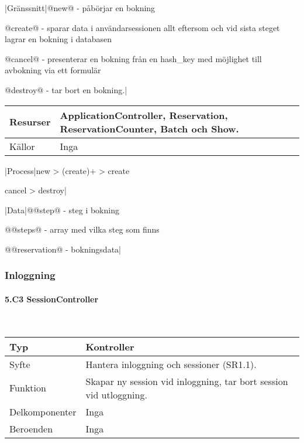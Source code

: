 \documentclass[a4paper, twoside, 11pt, titlepage]{article}
\begin{document}
			|Gränssnitt|@new@ - påbörjar en bokning

			@create@ - sparar data i användarsessionen allt eftersom och vid sista steget lagrar en bokning i databasen

			@cancel@ - presenterar en bokning från en hash\_key med möjlighet till avbokning via ett formulär

			@destroy@ - tar bort en bokning.|

			\begin {table} [ht] \begin{tabular} {  p{3.5cm} p{9.6cm} }
				\hline
				Resurser & ApplicationController, Reservation, ReservationCounter, Batch och Show.  \\
				\hline
				Källor & Inga  \\
				\hline
			\end{tabular} \end{table} \FloatBarrier
			\vspace{6mm}

			|Process|new > (create)+ > create

			cancel > destroy|

			|Data|@@step@ - steg i bokning

			@@steps@ - array med vilka steg som finns

			@@reservation@ - bokningsdata|

		\subsubsection{Inloggning}



			\paragraph{5.C3 SessionController}\

			\begin {table} [ht] \begin{tabular} {  p{3.5cm} p{9.6cm} }
				\hline
				Typ & Kontroller  \\
				\hline
				Syfte & Hantera inloggning och sessioner (SR1.1).  \\
				\hline
				Funktion & Skapar ny session vid inloggning, tar bort session vid utloggning.  \\
				\hline
				Delkomponenter & Inga  \\
				\hline
				Beroenden & Inga  \\
				\hline
			\end{tabular} \end{table} \FloatBarrier
			\vspace{6mm}
\end{document}
